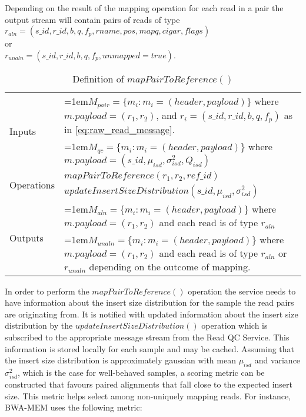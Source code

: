 Depending on the result of the mapping operation for each read in a pair the output stream will contain pairs of reads of type \\
$r_{aln} = (s\_id, r\_id, b, q, f_p, rname, pos, mapq, cigar, flags)$\\
or \\
$r_{unaln} = (s\_id, r\_id, b, q, f_p, unmapped=true)$. 

\bgroup
\def\arraystretch{1.5}
\begin{table}[!ht]
    \caption{Definition of $mapPairToReference()$}
    \label{tab:op_map_pair_to_reference}
    {\begin{tabular}{l|p{12cm}}
    \toprule
    \multirow{2}{*}{Inputs} & \hangindent=1em$M_{pair} = \{m_i: m_i = (header, payload)\}$ where $m.payload = (r_1,r_2)$, and $r_i = (s\_id, r\_id, b, q, f_p)$ as in \ref{eq:raw_read_message}. \\
    & \hangindent=1em$M_{qc} = \{m_i: m_i = (header, payload)\}$ where $m.payload = (s\_id, \mu_{isd}, \sigma_{isd}^2, Q_{isd})$\\
    \cline{2-2}
    \multirow{2}{*}{Operations} & $mapPairToReference(r_1,r_2, ref\_id)$\\
    & $updateInsertSizeDistribution(s\_id,\mu_{isd}, \sigma_{isd}^2)$\\
    \cline{2-2}
    \multirow{2}{*}{Outputs} & \hangindent=1em$M_{aln} = \{m_i: m_i = (header, payload)\}$ where $m.payload = (r_1,r_2)$ and each read is of type $r_{aln}$\\
    & \hangindent=1em$M_{unaln} = \{m_i: m_i = (header, payload)\}$ where $m.payload = (r_1,r_2)$ and each read is of type $r_{aln}$ or $r_{unaln}$ depending on the outcome of mapping.\\
    \bottomrule
    \end{tabular}}
\end{table}
\egroup

In order to perform the $mapPairToReference()$ operation the service needs to have information about the insert size distribution for the sample the read pairs are originating from. It is notified with updated information about the insert size distribution by the $updateInsertSizeDistribution()$ operation which is subscribed to the appropriate message stream from the Read QC Service. This information is stored locally for each sample and may be cached. Assuming that the insert size distribution is approximately gaussian with mean $\mu_{isd}$ and variance $\sigma_{isd}^2$, which is the case for well-behaved samples, a scoring metric can be constructed that favours paired alignments that fall close to the expected insert size. This metric helps select among non-uniquely mapping reads. For instance, BWA-MEM uses the following metric:

